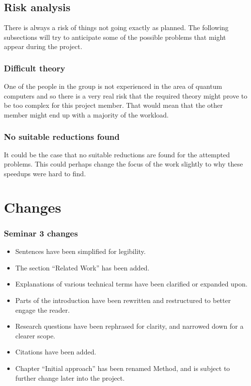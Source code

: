 \documentclass[msc,lith,english]{liuthesis}
\begin{document}
\newpage
\section{Risk analysis}
There is always a risk of things not going exactly as planned. The following subsections will try to anticipate some of the possible problems that might appear during the project.

\subsection{Difficult theory}
One of the people in the group is not experienced in the area of quantum computers and so there is a very real risk that the required theory might prove to be too complex for this project member. That would mean that the other member might end up with a majority of the workload.

\subsection{No suitable reductions found}
It could be the case that no suitable reductions are found for the attempted problems. This could perhaps change the focus of the work slightly to why these speedups were hard to find.

\appendix
\chapter{Changes}
\subsection{Seminar 3 changes}
\begin{itemize}
    \item Sentences have been simplified for legibility.
    \item The section ``Related Work'' has been added.
    \item Explanations of various technical terms have been clarified or expanded upon.
    \item Parts of the introduction have been rewritten and restructured to better engage the reader.
    \item Research questions have been rephrased for clarity, and narrowed down for a clearer scope.
    \item Citations have been added.
    \item Chapter ``Initial approach'' has been renamed Method, and is subject to further change later into the project.
\end{itemize}
\end{document}
